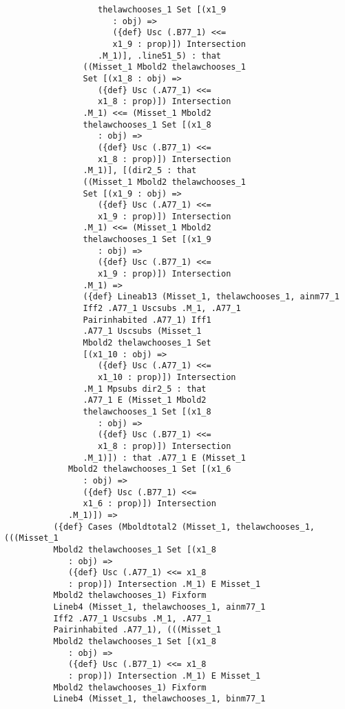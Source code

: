 \documentclass[12pt]{article}
\begin{document}
\begin{verbatim}
                   thelawchooses_1 Set [(x1_9 
                      : obj) => 
                      ({def} Usc (.B77_1) <<= 
                      x1_9 : prop)]) Intersection 
                   .M_1)], .line51_5) : that 
                ((Misset_1 Mbold2 thelawchooses_1 
                Set [(x1_8 : obj) => 
                   ({def} Usc (.A77_1) <<= 
                   x1_8 : prop)]) Intersection 
                .M_1) <<= (Misset_1 Mbold2 
                thelawchooses_1 Set [(x1_8 
                   : obj) => 
                   ({def} Usc (.B77_1) <<= 
                   x1_8 : prop)]) Intersection 
                .M_1)], [(dir2_5 : that 
                ((Misset_1 Mbold2 thelawchooses_1 
                Set [(x1_9 : obj) => 
                   ({def} Usc (.A77_1) <<= 
                   x1_9 : prop)]) Intersection 
                .M_1) <<= (Misset_1 Mbold2 
                thelawchooses_1 Set [(x1_9 
                   : obj) => 
                   ({def} Usc (.B77_1) <<= 
                   x1_9 : prop)]) Intersection 
                .M_1) => 
                ({def} Lineab13 (Misset_1, thelawchooses_1, ainm77_1 
                Iff2 .A77_1 Uscsubs .M_1, .A77_1 
                Pairinhabited .A77_1) Iff1 
                .A77_1 Uscsubs (Misset_1 
                Mbold2 thelawchooses_1 Set 
                [(x1_10 : obj) => 
                   ({def} Usc (.A77_1) <<= 
                   x1_10 : prop)]) Intersection 
                .M_1 Mpsubs dir2_5 : that 
                .A77_1 E (Misset_1 Mbold2 
                thelawchooses_1 Set [(x1_8 
                   : obj) => 
                   ({def} Usc (.B77_1) <<= 
                   x1_8 : prop)]) Intersection 
                .M_1)]) : that .A77_1 E (Misset_1 
             Mbold2 thelawchooses_1 Set [(x1_6 
                : obj) => 
                ({def} Usc (.B77_1) <<= 
                x1_6 : prop)]) Intersection 
             .M_1)]) => 
          ({def} Cases (Mboldtotal2 (Misset_1, thelawchooses_1, (((Misset_1 
          Mbold2 thelawchooses_1 Set [(x1_8 
             : obj) => 
             ({def} Usc (.A77_1) <<= x1_8 
             : prop)]) Intersection .M_1) E Misset_1 
          Mbold2 thelawchooses_1) Fixform 
          Lineb4 (Misset_1, thelawchooses_1, ainm77_1 
          Iff2 .A77_1 Uscsubs .M_1, .A77_1 
          Pairinhabited .A77_1), (((Misset_1 
          Mbold2 thelawchooses_1 Set [(x1_8 
             : obj) => 
             ({def} Usc (.B77_1) <<= x1_8 
             : prop)]) Intersection .M_1) E Misset_1 
          Mbold2 thelawchooses_1) Fixform 
          Lineb4 (Misset_1, thelawchooses_1, binm77_1 

\end{verbatim}
\end{document}
